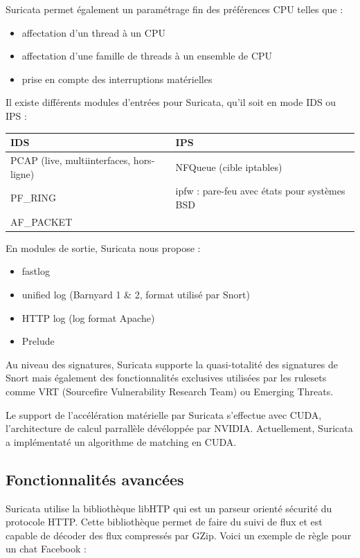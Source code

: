 \documentclass[a4paper,11pt,french]{article}
\begin{document}
Suricata permet également un paramétrage fin des préférences CPU telles que :
\begin{itemize}
\item affectation d’un thread à un CPU
\item affectation d’une famille de threads à un ensemble de CPU
\item prise en compte des interruptions matérielles
\end{itemize}

Il existe différents modules d’entrées pour Suricata, qu’il soit en mode IDS ou IPS :

\begin{center}
\begin{tabularx}{16cm}{|X|X|}
\hline
\textbf{IDS}&\textbf{IPS}\\
\hline
PCAP (live, multiinterfaces, hors-ligne)  & NFQueue (cible iptables)\\
PF\_RING & ipfw : pare-feu avec états pour systèmes BSD\\
AF\_PACKET & \\
\hline
\end{tabularx}
\end{center}


En modules de sortie, Suricata nous propose :
\begin{itemize}
\item fastlog
\item unified log (Barnyard 1 \& 2, format utilisé par Snort)
\item HTTP log (log format Apache)
\item Prelude 
\end{itemize}


Au niveau des signatures, Suricata supporte la quasi-totalité des signatures de Snort mais également des fonctionnalités exclusives utilisées par les rulesets comme VRT (Sourcefire Vulnerability Research Team)  ou Emerging Threats.


Le support de l’accélération matérielle par Suricata s’effectue avec CUDA, l’architecture de calcul parrallèle dévéloppée par NVIDIA. Actuellement, Suricata a implémentaté un algorithme de matching en CUDA.


\subsection{Fonctionnalités avancées}

Suricata utilise la bibliothèque libHTP qui est un parseur orienté sécurité du protocole HTTP. Cette bibliothèque permet de faire du suivi de flux et est capable de décoder des flux compressés par GZip. Voici un exemple de règle pour un chat Facebook :
\end{document}

